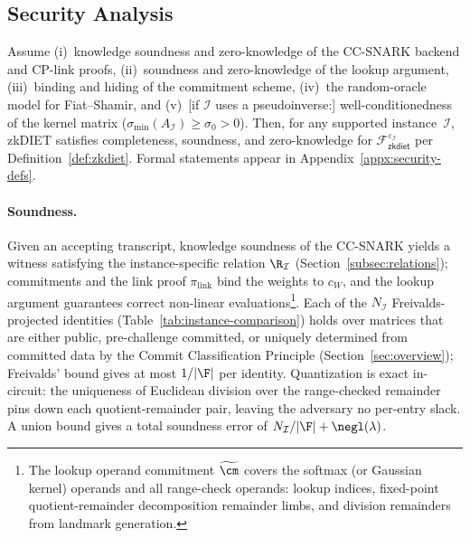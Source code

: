 \subsection{Security Analysis}
\label{sec:security-analysis}

\begin{theorem}[informal]
\label{thm:security}
Assume
(i)~knowledge soundness and zero-knowledge of the CC-SNARK backend and CP-link proofs,
(ii)~soundness and zero-knowledge of the lookup argument,
(iii)~binding and hiding of the commitment scheme,
(iv)~the random-oracle model for Fiat--Shamir, and
(v)~[if $\mathcal{I}$ uses a pseudoinverse:] well-conditionedness of the kernel matrix ($\sigma_{\min}(A_{\mathcal{I}}) \geq \sigma_0 > 0$).
Then, for any supported instance~$\mathcal{I}$, \textsf{zkDIET} satisfies completeness, soundness, and zero-knowledge for $\mathcal{F}^{\varepsilon_\mathcal{I}}_{\mathsf{zkdiet}}$ per Definition~\ref{def:zkdiet}. Formal statements appear in Appendix~\ref{appx:security-defs}.
\end{theorem}

\paragraph{Soundness.}
Given an accepting transcript, knowledge soundness of the CC-SNARK yields a witness satisfying the instance-specific relation $\R_\mathcal{I}$ (Section~\ref{subsec:relations}); commitments and the link proof $\pi_{\mathrm{link}}$ bind the weights to $c_W$, and the lookup argument guarantees correct non-linear evaluations\footnote{\label{fn:lkp-scope}The lookup operand commitment $\widetilde{\cm}$ covers the softmax (or Gaussian kernel) operands and all range-check operands: lookup indices, fixed-point quotient-remainder decomposition remainder limbs, and division remainders from landmark generation.}. Each of the $N_\mathcal{I}$ Freivalds-projected identities (Table~\ref{tab:instance-comparison}) holds over matrices that are either public, pre-challenge committed, or uniquely determined from committed data by the Commit Classification Principle (Section~\ref{sec:overview}); Freivalds' bound gives at most $1/|\F|$ per identity. Quantization is exact in-circuit: the uniqueness of Euclidean division over the range-checked remainder pins down each quotient-remainder pair, leaving the adversary no per-entry slack. A union bound gives a total soundness error of $N_\mathcal{I}/|\F| + \negl(\lambda)$.

